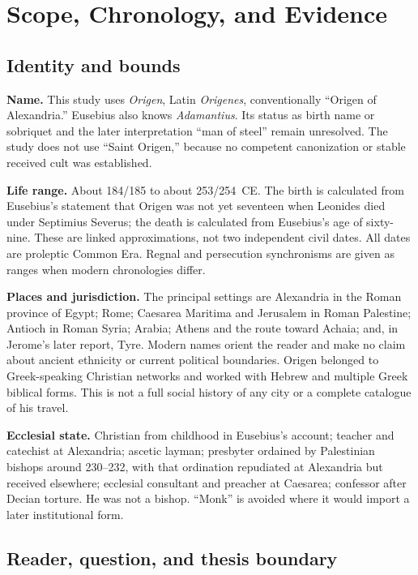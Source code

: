 \section{Scope, Chronology, and Evidence}
\label{sec:origen-apparatus}

\subsection{Identity and bounds}

\textbf{Name.} This study uses \emph{Origen}, Latin \emph{Origenes}, conventionally
``Origen of Alexandria.'' Eusebius also knows \emph{Adamantius}. Its status as
birth name or sobriquet and the later interpretation ``man of steel'' remain
unresolved. The study does not use ``Saint Origen,'' because no competent
canonization or stable received cult was established.

\textbf{Life range.} About 184/185 to about 253/254~CE. The birth is calculated
from Eusebius's statement that Origen was not yet seventeen when Leonides died
under Septimius Severus; the death is calculated from Eusebius's age of
sixty-nine. These are linked approximations, not two independent civil dates.
All dates are proleptic Common Era. Regnal and persecution synchronisms are
given as ranges when modern chronologies differ.

\textbf{Places and jurisdiction.} The principal settings are Alexandria in the
Roman province of Egypt; Rome; Caesarea Maritima and Jerusalem in Roman
Palestine; Antioch in Roman Syria; Arabia; Athens and the route toward Achaia;
and, in Jerome's later report, Tyre. Modern names orient the reader and make no
claim about ancient ethnicity or current political boundaries. Origen belonged
to Greek-speaking Christian networks and worked with Hebrew and multiple Greek
biblical forms. This is not a full social history of any city or a complete
catalogue of his travel.

\textbf{Ecclesial state.} Christian from childhood in Eusebius's account;
teacher and catechist at Alexandria; ascetic layman; presbyter ordained by
Palestinian bishops around 230--232, with that ordination repudiated at
Alexandria but received elsewhere; ecclesial consultant and preacher at
Caesarea; confessor after Decian torture. He was not a bishop. ``Monk'' is
avoided where it would import a later institutional form.

\subsection{Reader, question, and thesis boundary}

